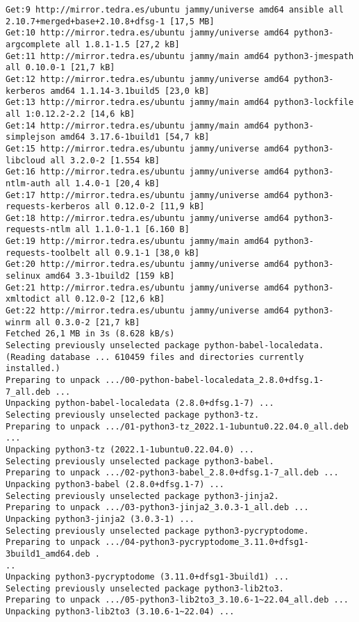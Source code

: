 \documentclass[../main.tex]{subfiles}
\begin{document}
\begin{lstlisting}
Get:9 http://mirror.tedra.es/ubuntu jammy/universe amd64 ansible all 2.10.7+merged+base+2.10.8+dfsg-1 [17,5 MB]
Get:10 http://mirror.tedra.es/ubuntu jammy/universe amd64 python3-argcomplete all 1.8.1-1.5 [27,2 kB]
Get:11 http://mirror.tedra.es/ubuntu jammy/main amd64 python3-jmespath all 0.10.0-1 [21,7 kB]
Get:12 http://mirror.tedra.es/ubuntu jammy/universe amd64 python3-kerberos amd64 1.1.14-3.1build5 [23,0 kB]
Get:13 http://mirror.tedra.es/ubuntu jammy/main amd64 python3-lockfile all 1:0.12.2-2.2 [14,6 kB]
Get:14 http://mirror.tedra.es/ubuntu jammy/main amd64 python3-simplejson amd64 3.17.6-1build1 [54,7 kB]
Get:15 http://mirror.tedra.es/ubuntu jammy/universe amd64 python3-libcloud all 3.2.0-2 [1.554 kB]
Get:16 http://mirror.tedra.es/ubuntu jammy/universe amd64 python3-ntlm-auth all 1.4.0-1 [20,4 kB]
Get:17 http://mirror.tedra.es/ubuntu jammy/universe amd64 python3-requests-kerberos all 0.12.0-2 [11,9 kB]
Get:18 http://mirror.tedra.es/ubuntu jammy/universe amd64 python3-requests-ntlm all 1.1.0-1.1 [6.160 B]
Get:19 http://mirror.tedra.es/ubuntu jammy/main amd64 python3-requests-toolbelt all 0.9.1-1 [38,0 kB]
Get:20 http://mirror.tedra.es/ubuntu jammy/universe amd64 python3-selinux amd64 3.3-1build2 [159 kB]
Get:21 http://mirror.tedra.es/ubuntu jammy/universe amd64 python3-xmltodict all 0.12.0-2 [12,6 kB]
Get:22 http://mirror.tedra.es/ubuntu jammy/universe amd64 python3-winrm all 0.3.0-2 [21,7 kB]
Fetched 26,1 MB in 3s (8.628 kB/s)   
Selecting previously unselected package python-babel-localedata.
(Reading database ... 610459 files and directories currently installed.)
Preparing to unpack .../00-python-babel-localedata_2.8.0+dfsg.1-7_all.deb ...
Unpacking python-babel-localedata (2.8.0+dfsg.1-7) ...
Selecting previously unselected package python3-tz.
Preparing to unpack .../01-python3-tz_2022.1-1ubuntu0.22.04.0_all.deb ...
Unpacking python3-tz (2022.1-1ubuntu0.22.04.0) ...
Selecting previously unselected package python3-babel.
Preparing to unpack .../02-python3-babel_2.8.0+dfsg.1-7_all.deb ...
Unpacking python3-babel (2.8.0+dfsg.1-7) ...
Selecting previously unselected package python3-jinja2.
Preparing to unpack .../03-python3-jinja2_3.0.3-1_all.deb ...
Unpacking python3-jinja2 (3.0.3-1) ...
Selecting previously unselected package python3-pycryptodome.
Preparing to unpack .../04-python3-pycryptodome_3.11.0+dfsg1-3build1_amd64.deb .
..
Unpacking python3-pycryptodome (3.11.0+dfsg1-3build1) ...
Selecting previously unselected package python3-lib2to3.
Preparing to unpack .../05-python3-lib2to3_3.10.6-1~22.04_all.deb ...
Unpacking python3-lib2to3 (3.10.6-1~22.04) ...

\end{lstlisting}
\end{document}
